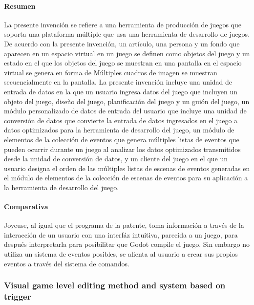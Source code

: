 \documentclass[]{article}
\begin{document}
\paragraph{Resumen}
La presente invenci\'on se refiere a una herramienta de producci\'on de juegos que soporta una plataforma m\'ultiple que usa una herramienta de desarrollo de juegos. De acuerdo con la presente invenci\'on, un art\'iculo, una persona y un fondo que aparecen en un espacio virtual en un juego se definen como objetos del juego y un estado en el que los objetos del juego se muestran en una pantalla en el espacio virtual se genera en forma de M\'ultiples cuadros de imagen se muestran secuencialmente en la pantalla. La presente invenci\'on incluye una unidad de entrada de datos en la que un usuario ingresa datos del juego que incluyen un objeto del juego, dise\~no del juego, planificación del juego y un gui\'on del juego, un módulo personalizado de datos de entrada del usuario que incluye una unidad de conversi\'on de datos que convierte la entrada de datos ingresados en el juego a datos optimizados para la herramienta de desarrollo del juego, un m\'odulo de elementos de la colecci\'on de eventos que genera m\'ultiples listas de eventos que pueden ocurrir durante un juego al analizar los datos optimizados transmitidos desde la unidad de conversi\'on de datos, y un cliente del juego en el que un usuario designa el orden de las m\'ultiples listas de escenas de eventos generadas en el m\'odulo de elementos de la colecci\'on de escenas de eventos para su aplicaci\'on a la herramienta de desarrollo del juego.
\cite{multip}
\paragraph{Comparativa}
Joyeuse, al igual que el programa de la patente, toma informaci\'on a trav\'es de la interacci\'on de un usuario con una interf\'az intuitiva, parecida a un juego, para despu\'es interpretarla para posibilitar que Godot compile el juego. Sin embargo no utiliza un sistema de eventos posibles, se alienta al usuario a crear sus propios eventos a trav\'es del sistema de comandos. 
\subsubsection{Visual game level editing method and system based on trigger}
\end{document}
